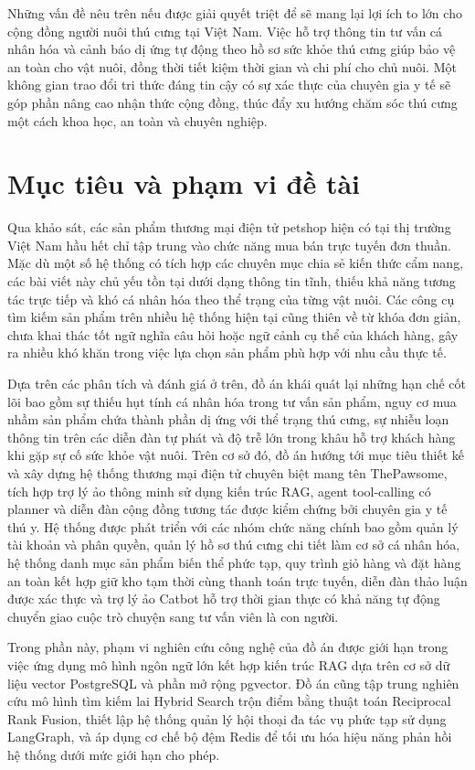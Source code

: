 \documentclass[../DoAn.tex]{subfiles}
\begin{document}
Những vấn đề nêu trên nếu được giải quyết triệt để sẽ mang lại lợi ích to lớn cho cộng đồng người nuôi thú cưng tại Việt Nam. Việc hỗ trợ thông tin tư vấn cá nhân hóa và cảnh báo dị ứng tự động theo hồ sơ sức khỏe thú cưng giúp bảo vệ an toàn cho vật nuôi, đồng thời tiết kiệm thời gian và chi phí cho chủ nuôi. Một không gian trao đổi tri thức đáng tin cậy có sự xác thực của chuyên gia y tế sẽ góp phần nâng cao nhận thức cộng đồng, thúc đẩy xu hướng chăm sóc thú cưng một cách khoa học, an toàn và chuyên nghiệp.

\section{Mục tiêu và phạm vi đề tài}
\label{section:1.2}

Qua khảo sát, các sản phẩm thương mại điện tử petshop hiện có tại thị trường Việt Nam hầu hết chỉ tập trung vào chức năng mua bán trực tuyến đơn thuần. Mặc dù một số hệ thống có tích hợp các chuyên mục chia sẻ kiến thức cẩm nang, các bài viết này chủ yếu tồn tại dưới dạng thông tin tĩnh, thiếu khả năng tương tác trực tiếp và khó cá nhân hóa theo thể trạng của từng vật nuôi. Các công cụ tìm kiếm sản phẩm trên nhiều hệ thống hiện tại cũng thiên về từ khóa đơn giản, chưa khai thác tốt ngữ nghĩa câu hỏi hoặc ngữ cảnh cụ thể của khách hàng, gây ra nhiều khó khăn trong việc lựa chọn sản phẩm phù hợp với nhu cầu thực tế.

Dựa trên các phân tích và đánh giá ở trên, đồ án khái quát lại những hạn chế cốt lõi bao gồm sự thiếu hụt tính cá nhân hóa trong tư vấn sản phẩm, nguy cơ mua nhầm sản phẩm chứa thành phần dị ứng với thể trạng thú cưng, sự nhiễu loạn thông tin trên các diễn đàn tự phát và độ trễ lớn trong khâu hỗ trợ khách hàng khi gặp sự cố sức khỏe vật nuôi. Trên cơ sở đó, đồ án hướng tới mục tiêu thiết kế và xây dựng hệ thống thương mại điện tử chuyên biệt mang tên ThePawsome, tích hợp trợ lý ảo thông minh sử dụng kiến trúc RAG, agent tool-calling có planner và diễn đàn cộng đồng tương tác được kiểm chứng bởi chuyên gia y tế thú y. Hệ thống được phát triển với các nhóm chức năng chính bao gồm quản lý tài khoản và phân quyền, quản lý hồ sơ thú cưng chi tiết làm cơ sở cá nhân hóa, hệ thống danh mục sản phẩm biến thể phức tạp, quy trình giỏ hàng và đặt hàng an toàn kết hợp giữ kho tạm thời cùng thanh toán trực tuyến, diễn đàn thảo luận được xác thực và trợ lý ảo Catbot hỗ trợ thời gian thực có khả năng tự động chuyển giao cuộc trò chuyện sang tư vấn viên là con người.

Trong phần này, phạm vi nghiên cứu công nghệ của đồ án được giới hạn trong việc ứng dụng mô hình ngôn ngữ lớn kết hợp kiến trúc RAG dựa trên cơ sở dữ liệu vector PostgreSQL và phần mở rộng pgvector. Đồ án cũng tập trung nghiên cứu mô hình tìm kiếm lai Hybrid Search trộn điểm bằng thuật toán Reciprocal Rank Fusion, thiết lập hệ thống quản lý hội thoại đa tác vụ phức tạp sử dụng LangGraph, và áp dụng cơ chế bộ đệm Redis để tối ưu hóa hiệu năng phản hồi hệ thống dưới mức giới hạn cho phép.
\end{document}
